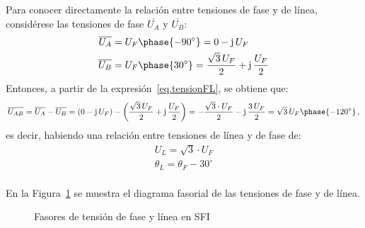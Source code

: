 	Para conocer directamente la relación entre tensiones de fase y de línea, considérese las tensiones de fase $\overline{U_A}$ y $\overline{U_B}$: 
	\begin{align*}
		\overline{U_A} &= U_F\phase{-90^\circ}=0-\mathrm{j}\,U_F
		\\
		\overline{U_B} &= U_F\phase{30^\circ}=\dfrac{\sqrt{3}\,U_F}{2}+\mathrm{j}\,\dfrac{U_F}{2}
	\end{align*}
	Entonces, a partir de la expresión~\eqref{eq.tensionFL}, se obtiene que: 
	\begin{equation*}
		\overline{U_{AB}}=\overline{U_{A}}-\overline{U_{B}}=(0-\mathrm{j}\,U_F)-\left(\dfrac{\sqrt{3}\,U_F}{2}+\mathrm{j}\,\dfrac{U_F}{2}\right)=-\dfrac{\sqrt{3}\cdot U_F}{2}-\mathrm{j}\,\dfrac{3\,U_F}{2}=\sqrt{3}\,U_F \phase{-120^\circ}\,,
	\end{equation*}
	es decir, habiendo una relación entre tensiones de línea y de fase de: 
	\begin{equation}\label{eq.sfi_fase-linea}
		\boxed{
			\begin{array}{l}
				U_L = \sqrt{3}\cdot U_F\\
				\theta_L = \theta_F - 30^\circ\\
			\end{array}
		} 
	\end{equation}
	
	En la Figura~\ref{fig.linea-fase-SFI} se muestra el diagrama fasorial de las tensiones de fase y de línea. 

	\begin{figure}[H]
		\centering
		\hfil
		\caption{Fasores de tensión de fase y línea en SFI}
		\label{fig.linea-fase-SFI}
	\end{figure}
	
